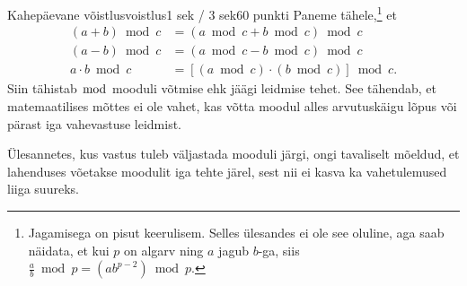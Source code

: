 \begin{yl}{4}{Kahepäevane võistlus}{voistlus}{1 sek / 3 sek}{60 punkti}
  Paneme tähele,\footnote{Jagamisega on pisut keerulisem.
    Selles ülesandes ei ole see oluline, aga saab näidata, et kui $p$ on algarv ning
    $a$ jagub $b$-ga, siis $\frac{a}{b} \bmod{p} = (a b^{p - 2}) \bmod{p}$.} et
  \begin{align*}
    (a + b) \bmod{c} &= (a \bmod{c} + b \bmod{c}) \bmod{c} \\
    (a - b) \bmod{c} &= (a \bmod{c} - b \bmod{c}) \bmod{c} \\
    a \cdot b \bmod{c} &= [(a \bmod{c}) \cdot (b \bmod{c})] \bmod{c}.
  \end{align*}
  Siin tähistab $\bmod$ mooduli võtmise ehk jäägi leidmise tehet.
  See tähendab, et matemaatilises mõttes ei ole vahet, kas võtta moodul alles
  arvutuskäigu lõpus või pärast iga vahevastuse leidmist.

  Ülesannetes, kus vastus tuleb väljastada mooduli järgi, ongi tavaliselt
  mõeldud, et lahenduses võetakse moodulit iga tehte
  järel, sest nii ei kasva ka vahetulemused liiga suureks.
\end{yl}
